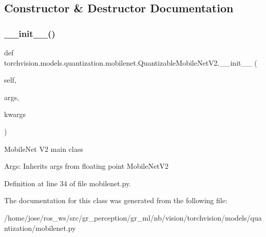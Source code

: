 \subsection{Constructor \& Destructor Documentation}
\mbox{\label{classtorchvision_1_1models_1_1quantization_1_1mobilenet_1_1QuantizableMobileNetV2_a9a3d16a54240060c280eded19d19eee8}} 
\subsubsection{\texorpdfstring{\+\_\+\+\_\+init\+\_\+\+\_\+()}{\_\_init\_\_()}}
{\footnotesize\ttfamily def torchvision.\+models.\+quantization.\+mobilenet.\+Quantizable\+Mobile\+Net\+V2.\+\_\+\+\_\+init\+\_\+\+\_\+ (\begin{DoxyParamCaption}\item[{}]{self,  }\item[{}]{args,  }\item[{}]{kwargs }\end{DoxyParamCaption})}

\begin{DoxyVerb}MobileNet V2 main class

Args:
   Inherits args from floating point MobileNetV2
\end{DoxyVerb}
 

Definition at line 34 of file mobilenet.\+py.



The documentation for this class was generated from the following file\+:\begin{DoxyCompactItemize}
\item 
/home/jose/ros\+\_\+ws/src/gr\+\_\+perception/gr\+\_\+ml/nb/vision/torchvision/models/quantization/mobilenet.\+py\end{DoxyCompactItemize}
